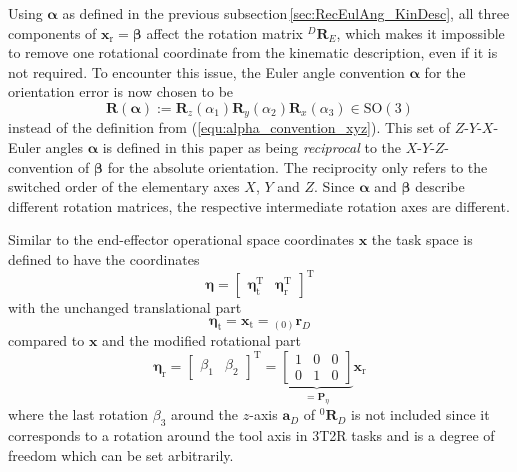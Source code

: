 \documentclass{svproc}
\newcommand{\bm}[1]{\boldsymbol{#1}}
\newcommand{\ortvek}[4]{{ }_{(#1)}{\boldsymbol{#2}}^{#3}_{#4} }
\newcommand{\rotmat}[2]{{{ }^{#1}\boldsymbol{R}}_{#2}}
\newcommand{\transp}[0]{{\mathrm{T}}}
\begin{document}
Using $\bm{\alpha}$ as defined in the previous subsection\,\ref{sec:RecEulAng_KinDesc}, all three components of $\bm{x}_{\mathrm{r}}=\bm{\beta}$ affect the rotation matrix $\rotmat{D}{E}$, which makes it impossible to remove one rotational coordinate from the kinematic description, even if it is not required.
%
To encounter this issue, the Euler angle convention $\bm{\alpha}$ for the orientation error is now chosen to be 
%
\begin{equation}
\bm{R}(\bm{\alpha}) := \bm{R}_z(\alpha_1) \bm{R}_y(\alpha_2) \bm{R}_x(\alpha_3) \in \mathrm{SO(3)}
\label{equ:def_rmat_zyxr}
\end{equation}
%
instead of the definition from (\ref{equ:alpha_convention_xyz}).
This set of $Z$-$Y$-$X$-Euler angles $\bm{\alpha}$ is defined in this paper as being \emph{reciprocal} to the $X$-$Y$-$Z$-convention of $\bm{\beta}$ for the absolute orientation.
%
The reciprocity only refers to the switched order of the elementary axes $X$, $Y$ and $Z$.
Since $\bm{\alpha}$ and $\bm{\beta}$ describe different rotation matrices, the respective intermediate rotation axes are different.

Similar to the end-effector operational space coordinates $\bm{x}$ the task space is defined to have the coordinates
%
\begin{equation}
\bm{\eta}
=
\begin{bmatrix}
\bm{\eta}_{\mathrm{t}}^\transp & 
\bm{\eta}_{\mathrm{r}}^\transp
\end{bmatrix}^\transp
\end{equation}  
%
with the unchanged translational part
%
\begin{equation}
\bm{\eta}_{\mathrm{t}}
=
\bm{x}_{\mathrm{t}}
=
\ortvek{0}{r}{}{D}
\end{equation}  
%
compared to $\bm{x}$ and the modified rotational part
%
\begin{equation}
\bm{\eta}_{\mathrm{r}}
=
\begin{bmatrix}
\beta_1  & \beta_2
\end{bmatrix}^\transp
=
\underbrace{\begin{bmatrix}
1 & 0 & 0  \\ 
0 & 1 & 0
\end{bmatrix}}_{=\bm{P}_{\eta}}
\bm{x}_{\mathrm{r}}
\label{equ:etar_def}
\end{equation}
%
where the last rotation $\beta_3$ around the $z$-axis $\bm{a}_{D}$ of $\rotmat{0}{D}$ is not included since it corresponds to a rotation around the tool axis in 3T2R tasks and is a degree of freedom which can be set arbitrarily.
\end{document}
